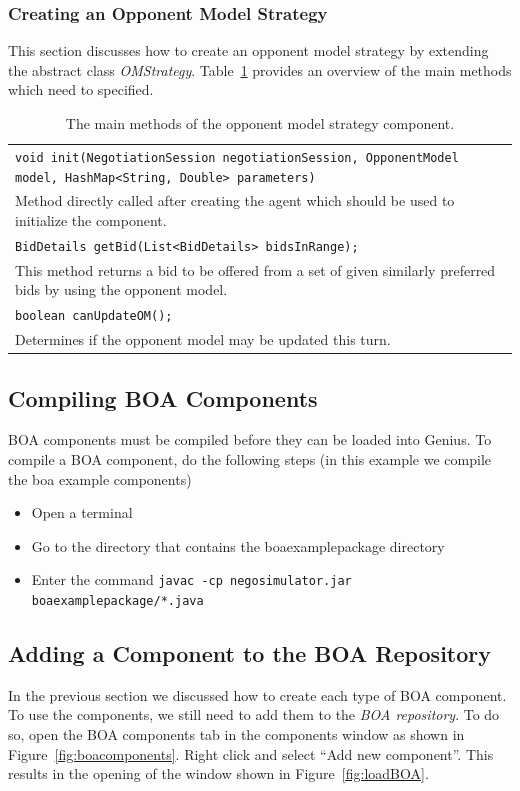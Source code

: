 \documentclass[]{article}
\begin{document}
\subsubsection{Creating an Opponent Model Strategy}
This section discusses how to create an opponent model strategy by extending the abstract class \textit{OMStrategy}. Table~\ref{tab:BOAoms} provides an overview of the main methods which need to specified.

\begin{table}[h]
\begin{tabular}{m{}}
\hline
\texttt{void init(NegotiationSession negotiationSession, OpponentModel model, HashMap<String, Double> parameters)}\\
Method directly called after creating the agent which should be used to initialize the component.\\
\hline
\texttt{BidDetails getBid(List<BidDetails> bidsInRange);}\\
This method returns a bid to be offered from a set of given similarly preferred bids by using the opponent model.\\
\hline
\texttt{boolean canUpdateOM();}\\
Determines if the opponent model may be updated this turn.\\
\hline
\end{tabular}
\caption{The main methods of the opponent model strategy component.}
\label{tab:BOAoms}
\end{table}

\subsection{Compiling BOA Components}
BOA components must be compiled before they can be loaded into Genius.
To compile a BOA component, do the following steps (in this example we compile the boa example components)
\begin{itemize}
\item Open a terminal 
\item Go to the directory that contains the boaexamplepackage directory
\item Enter the command \texttt{javac -cp negosimulator.jar boaexamplepackage/*.java }
\end{itemize}



\subsection{Adding a Component to the BOA Repository}
In the previous section we discussed how to create each type of BOA component. To use the components, we still need to add them to the \textit{BOA repository}. To do so, open the BOA components tab in the components window as shown in Figure~\ref{fig:boacomponents}. Right click and select ``Add new component''. This results in the opening of the window shown in Figure~\ref{fig:loadBOA}.
\end{document}
